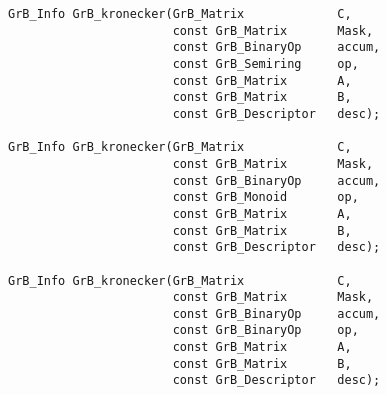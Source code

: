 \documentclass[11pt]{article}
\begin{document}
\begin{verbatim}
GrB_Info GrB_kronecker(GrB_Matrix             C,
                       const GrB_Matrix       Mask,
                       const GrB_BinaryOp     accum,
                       const GrB_Semiring     op,
                       const GrB_Matrix       A,
                       const GrB_Matrix       B,
                       const GrB_Descriptor   desc);

GrB_Info GrB_kronecker(GrB_Matrix             C,
                       const GrB_Matrix       Mask,
                       const GrB_BinaryOp     accum,
                       const GrB_Monoid       op,
                       const GrB_Matrix       A,
                       const GrB_Matrix       B,
                       const GrB_Descriptor   desc);

GrB_Info GrB_kronecker(GrB_Matrix             C,
                       const GrB_Matrix       Mask,
                       const GrB_BinaryOp     accum,
                       const GrB_BinaryOp     op,
                       const GrB_Matrix       A,
                       const GrB_Matrix       B,
                       const GrB_Descriptor   desc);
\end{verbatim}

\end{document}
